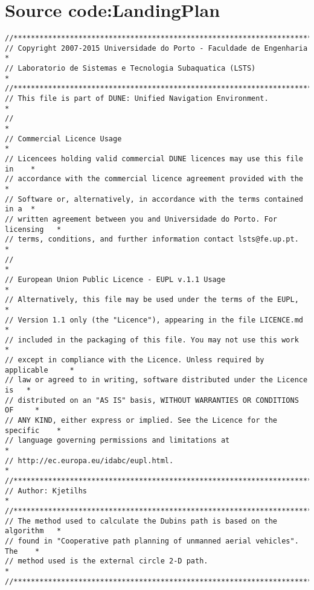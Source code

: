 \chapter{Source code:LandingPlan}
\begin{frame}[fragile]
\begin{lstlisting}
//***************************************************************************
// Copyright 2007-2015 Universidade do Porto - Faculdade de Engenharia      *
// Laboratorio de Sistemas e Tecnologia Subaquatica (LSTS)                  *
//***************************************************************************
// This file is part of DUNE: Unified Navigation Environment.               *
//                                                                          *
// Commercial Licence Usage                                                 *
// Licencees holding valid commercial DUNE licences may use this file in    *
// accordance with the commercial licence agreement provided with the       *
// Software or, alternatively, in accordance with the terms contained in a  *
// written agreement between you and Universidade do Porto. For licensing   *
// terms, conditions, and further information contact lsts@fe.up.pt.        *
//                                                                          *
// European Union Public Licence - EUPL v.1.1 Usage                         *
// Alternatively, this file may be used under the terms of the EUPL,        *
// Version 1.1 only (the "Licence"), appearing in the file LICENCE.md       *
// included in the packaging of this file. You may not use this work        *
// except in compliance with the Licence. Unless required by applicable     *
// law or agreed to in writing, software distributed under the Licence is   *
// distributed on an "AS IS" basis, WITHOUT WARRANTIES OR CONDITIONS OF     *
// ANY KIND, either express or implied. See the Licence for the specific    *
// language governing permissions and limitations at                        *
// http://ec.europa.eu/idabc/eupl.html.                                     *
//***************************************************************************
// Author: Kjetilhs                                                         *
//***************************************************************************
// The method used to calculate the Dubins path is based on the algorithm   *
// found in "Cooperative path planning of unmanned aerial vehicles". The    *
// method used is the external circle 2-D path.                             *
//***************************************************************************


\end{lstlisting}
\end{frame}
